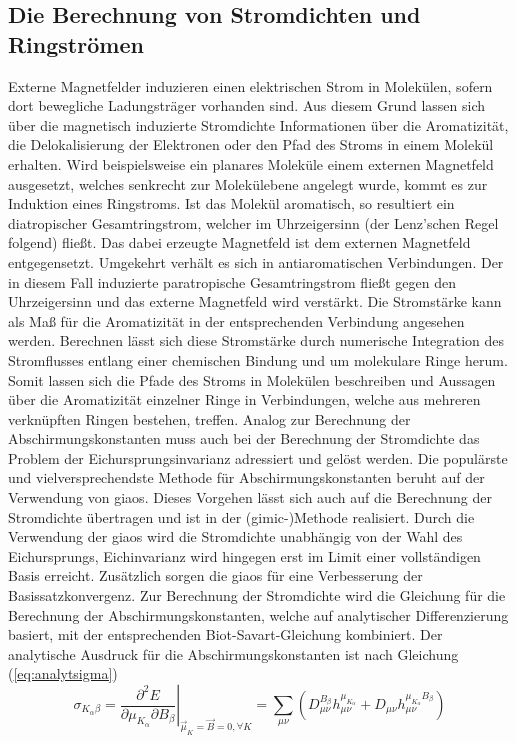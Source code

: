 \newpage
\subsection{Die Berechnung von Stromdichten und Ringströmen}
Externe Magnetfelder induzieren einen elektrischen Strom in Molekülen, sofern dort bewegliche Ladungsträger vorhanden sind. Aus diesem Grund lassen sich über die magnetisch induzierte Stromdichte Informationen über die Aromatizität, die Delokalisierung der Elektronen oder den Pfad des Stroms in einem Molekül erhalten.\supercite{fliegl2011gauge} Wird beispielsweise ein planares Moleküle einem externen Magnetfeld ausgesetzt, welches senkrecht zur Molekülebene angelegt wurde, kommt es zur Induktion eines Ringstroms. Ist das Molekül aromatisch, so resultiert ein diatropischer Ge\-samt\-ring\-strom, welcher im Uhrzeigersinn (der Lenz'schen Regel folgend) fließt. Das dabei erzeugte Magnetfeld ist dem externen Magnetfeld entgegensetzt. Umgekehrt verhält es sich in antiaromatischen Verbindungen. Der in diesem Fall induzierte paratropische Gesamtringstrom fließt gegen den Uhrzeigersinn und das externe Magnetfeld wird verstärkt. Die Stromstärke kann als Maß für die Aromatizität in der entsprechenden Verbindung angesehen werden. Berechnen lässt sich diese Stromstärke durch numerische Integration des Stromflusses entlang einer chemischen Bindung und um molekulare Ringe herum. Somit lassen sich die Pfade des Stroms in Molekülen beschreiben und Aussagen über die Aromatizität einzelner Ringe in Verbindungen, welche aus mehreren verknüpften Ringen bestehen, treffen. Analog zur Berechnung der Abschirmungskonstanten muss auch bei der Berechnung der Stromdichte das Problem der Eichursprungsinvarianz adressiert und gelöst werden. Die populärste und vielversprechendste Methode für Abschirmungskonstanten beruht auf der Verwendung von \acp{giao}. Dieses Vorgehen lässt sich auch auf die Berechnung der Stromdichte übertragen und ist in der \mbox{(\acs{gimic}-)}Methode\supercite{juselius2004calculation,taubert2011calculation,fliegl2011gauge,sundholm2016calculations} realisiert. Durch die Verwendung der \acp{giao} wird die Stromdichte unabhängig von der Wahl des Eichursprungs, Eichinvarianz wird hingegen erst im Limit einer vollständigen Basis erreicht.\supercite{juselius2004calculation} Zusätzlich sorgen die \acp{giao} für eine Verbesserung der Basissatzkonvergenz.\supercite{fliegl2011gauge} Zur Berechnung der Stromdichte wird die Gleichung für die Berechnung der Abschirmungskonstanten, welche auf analytischer Differenzierung basiert, mit der entsprechenden Biot-Savart-Gleichung kombiniert.\supercite{lazzeretti2000ring} Der analytische Ausdruck für die Abschirmungskonstanten ist nach Gleichung (\ref{eq:analytsigma}) 
    \begin{equation}\label{eq:sigmaana}
    \sigma_{K_\alpha\beta}=\left.\frac{\partial^2 E}{\partial \mu_{K_\alpha}\partial B_\beta}\right|_{\vec{\mu}_K=\vec{B}=0,\forall K}=\sum_{\mu\nu}\left(D_{\mu\nu}^{B_\beta}h_{\mu\nu}^{\mu_{K_\alpha}}+D_{\mu\nu}h_{\mu\nu}^{\mu_{K_\alpha}B_\beta}\right) 
    \end{equation}
\vfill 
\newpage
    
